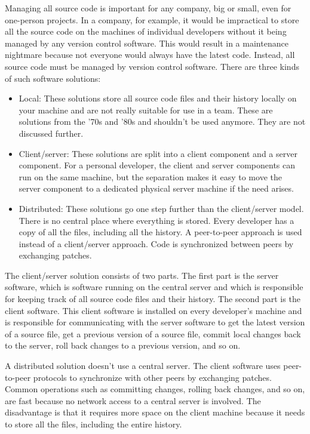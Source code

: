 Managing all source code is important for any company, big or small, even for one-person projects. In a company, for example, it would be impractical to store all the source code on the machines of individual developers without it being managed by any version control software. This would result in a maintenance nightmare because not everyone would always have the latest code. Instead, all source code must be managed by version control software. There are three kinds of such software solutions:

\begin{itemize}
\item
Local: These solutions store all source code files and their history locally on your machine and are not really suitable for use in a team. These are solutions from the ’70s and ’80s and shouldn’t be used anymore. They are not discussed further.

\item
Client/server: These solutions are split into a client component and a server component. For a personal developer, the client and server components can run on the same machine, but the separation makes it easy to move the server component to a dedicated physical server machine if the need arises.

\item
Distributed: These solutions go one step further than the client/server model. There is no central place where everything is stored. Every developer has a copy of all the files, including all the history. A peer-to-peer approach is used instead of a client/server approach. Code is synchronized between peers by exchanging patches.
\end{itemize}

The client/server solution consists of two parts. The first part is the server software, which is software running on the central server and which is responsible for keeping track of all source code files and their history. The second part is the client software. This client software is installed on every developer’s machine and is responsible for communicating with the server software to get the latest version of a source file, get a previous version of a source file, commit local changes back to the server, roll back changes to a previous version, and so on.

A distributed solution doesn’t use a central server. The client software uses peer-to-peer protocols to synchronize with other peers by exchanging patches. Common operations such as committing changes, rolling back changes, and so on, are fast because no network access to a central server is involved. The disadvantage is that it requires more space on the client machine because it needs to store all the files, including the entire history.

